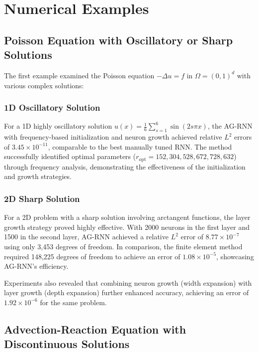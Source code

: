 \documentclass[11pt,a4paper]{article}
\begin{document}
\section{Numerical Examples}

\subsection{Poisson Equation with Oscillatory or Sharp Solutions}

The first example examined the Poisson equation $-\Delta u = f$ in $\Omega = (0,1)^d$ with various complex solutions:

\subsubsection{1D Oscillatory Solution}

For a 1D highly oscillatory solution $u(x) = \frac{1}{6}\sum_{s=1}^6 \sin(2s\pi x)$, the AG-RNN with frequency-based initialization and neuron growth achieved relative $L^2$ errors of $3.45 \times 10^{-11}$, comparable to the best manually tuned RNN. The method successfully identified optimal parameters ($r_{\text{opt}} = 152, 304, 528, 672, 728, 632$) through frequency analysis, demonstrating the effectiveness of the initialization and growth strategies.

\subsubsection{2D Sharp Solution}

For a 2D problem with a sharp solution involving arctangent functions, the layer growth strategy proved highly effective. With 2000 neurons in the first layer and 1500 in the second layer, AG-RNN achieved a relative $L^2$ error of $8.77 \times 10^{-7}$ using only 3,453 degrees of freedom. In comparison, the finite element method required 148,225 degrees of freedom to achieve an error of $1.08 \times 10^{-5}$, showcasing AG-RNN's efficiency.

Experiments also revealed that combining neuron growth (width expansion) with layer growth (depth expansion) further enhanced accuracy, achieving an error of $1.92 \times 10^{-6}$ for the same problem.

\subsection{Advection-Reaction Equation with Discontinuous Solutions}
\end{document}
